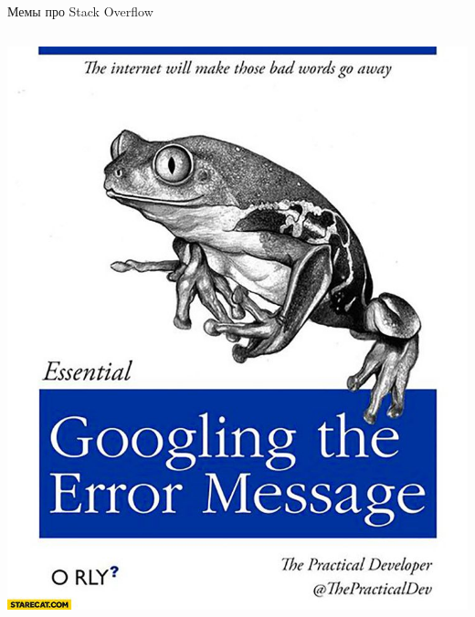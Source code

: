 \documentclass[newPxFont]{beamer}
\begin{document}
\begin{frame}{Мемы про Stack Overflow} 
\begin{columns}
\begin{column}{.48\linewidth}
\includegraphics[width=\linewidth]{googling.jpg}\\
\end{column}



\end{columns}
\end{frame}
\end{document}
